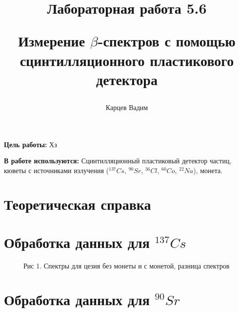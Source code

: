 \documentclass[12pt]{article}
\author{Карцев Вадим}
\title{Лабораторная работа 5.6

Измерение $\beta$-спектров с помощью сцинтилляционного пластикового детектора}
\begin{document}
  \maketitle

  \textbf{Цель работы:} Хз

  \textbf{В работе используются:} Сцинтилляционный пластиковый детектор частиц,
  кюветы с источниками излучения ($^{137}Cs$, $^{90}Sr$, $^{36}Cl$, $^{60}Co$,
  $^{22}Na$), монета.

  \section{Теоретическая справка}

  \newpage
  \section{Обработка данных для $^{137}Cs$}

    \begin{figure}[h!]
      \begin{minipage}[h]{0.99\linewidth}
        Рис 1. Спектры для цезия без монеты и с монетой, разница спектров
      \end{minipage}
      \label{chart:cesium}
    \end{figure}

  \newpage
  \section{Обработка данных для $^{90}Sr$}
\end{document}
